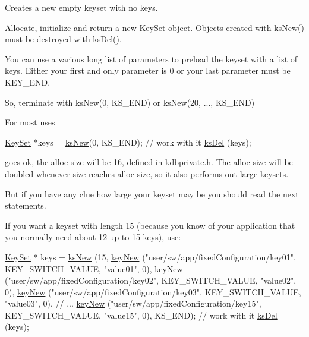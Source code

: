 Creates a new empty keyset with no keys. 

Allocate, initialize and return a new \hyperlink{classkdb_1_1KeySet}{Key\+Set} object. Objects created with \hyperlink{group__keyset_ga671e1aaee3ae9dc13b4834a4ddbd2c3c}{ks\+New()} must be destroyed with \hyperlink{group__keyset_ga27e5c16473b02a422238c8d970db7ac8}{ks\+Del()}.

You can use a various long list of parameters to preload the keyset with a list of keys. Either your first and only parameter is 0 or your last parameter must be K\+E\+Y\+\_\+\+E\+N\+D.

So, terminate with ks\+New(0, K\+S\+\_\+\+E\+N\+D) or ks\+New(20, ..., K\+S\+\_\+\+E\+N\+D)

For most uses 
\begin{DoxyCode}
\hyperlink{classkdb_1_1KeySet_a4eac9850fa4f06c07a5306befc3e4377}{KeySet} *keys = \hyperlink{group__keyset_ga671e1aaee3ae9dc13b4834a4ddbd2c3c}{ksNew}(0, KS\_END);
\textcolor{comment}{// work with it}
\hyperlink{group__keyset_ga27e5c16473b02a422238c8d970db7ac8}{ksDel} (keys);
\end{DoxyCode}
 goes ok, the alloc size will be 16, defined in kdbprivate.\+h. The alloc size will be doubled whenever size reaches alloc size, so it also performs out large keysets.

But if you have any clue how large your keyset may be you should read the next statements.

If you want a keyset with length 15 (because you know of your application that you normally need about 12 up to 15 keys), use\+: 
\begin{DoxyCode}
\hyperlink{classkdb_1_1KeySet_a4eac9850fa4f06c07a5306befc3e4377}{KeySet} * keys = \hyperlink{group__keyset_ga671e1aaee3ae9dc13b4834a4ddbd2c3c}{ksNew} (15,
        \hyperlink{group__key_gad23c65b44bf48d773759e1f9a4d43b89}{keyNew} (\textcolor{stringliteral}{"user/sw/app/fixedConfiguration/key01"}, KEY\_SWITCH\_VALUE, \textcolor{stringliteral}{"value01"}, 0),
        \hyperlink{group__key_gad23c65b44bf48d773759e1f9a4d43b89}{keyNew} (\textcolor{stringliteral}{"user/sw/app/fixedConfiguration/key02"}, KEY\_SWITCH\_VALUE, \textcolor{stringliteral}{"value02"}, 0),
        \hyperlink{group__key_gad23c65b44bf48d773759e1f9a4d43b89}{keyNew} (\textcolor{stringliteral}{"user/sw/app/fixedConfiguration/key03"}, KEY\_SWITCH\_VALUE, \textcolor{stringliteral}{"value03"}, 0),
        \textcolor{comment}{// ...}
        \hyperlink{group__key_gad23c65b44bf48d773759e1f9a4d43b89}{keyNew} (\textcolor{stringliteral}{"user/sw/app/fixedConfiguration/key15"}, KEY\_SWITCH\_VALUE, \textcolor{stringliteral}{"value15"}, 0),
        KS\_END);
\textcolor{comment}{// work with it}
\hyperlink{group__keyset_ga27e5c16473b02a422238c8d970db7ac8}{ksDel} (keys);
\end{DoxyCode}


